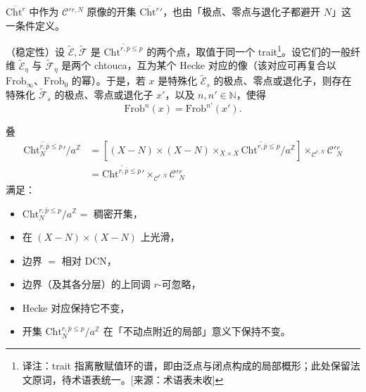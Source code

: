 \begin{lemma*}
$\overline{\mathrm{Cht}^{r}}$ 中作为 $\mathcal{C}'{}^{r,N}$ 原像的开集 $\overline{\mathrm{Cht}^{r}}{}'$，也由「极点、零点与退化子都避开 $N$」这一条件定义。
\end{lemma*}

\begin{theorem*}
（稳定性）设 $\tilde{\mathcal{E}},\tilde{\mathcal{F}}$ 是 $\overline{\mathrm{Cht}^{r,\bar{p}\le p}}$ 的两个点，取值于同一个 trait\footnote{译注：trait 指离散赋值环的谱，即由泛点与闭点构成的局部概形；此处保留法文原词，待术语表统一。[来源：术语表未收]}。设它们的一般纤维 $\tilde{\mathcal{E}}_{\eta}$ 与 $\tilde{\mathcal{F}}_{\eta}$ 是两个 chtouca，互为某个 Hecke 对应的像（该对应可再复合以 $\mathrm{Frob}_{\infty}$、$\mathrm{Frob}_{0}$ 的幂）。于是，若 $x$ 是特殊化 $\tilde{\mathcal{E}}_{s}$ 的极点、零点或退化子，则存在特殊化 $\tilde{\mathcal{F}}_{s}$ 的极点、零点或退化子 $x'$，以及 $n,n'\in\mathbb{N}$，使得
\[
\mathrm{Frob}^{n}(x)=\mathrm{Frob}^{n'}(x').
\]
\end{theorem*}

\begin{corollary*}
叠
\[
\begin{aligned}
\overline{\mathrm{Cht}^{r,\bar{p}\le p}_{N}}{}'/a^{\mathbb{Z}}&=[(X-N)\times(X-N)\times_{X\times X}\overline{\mathrm{Cht}^{r,\bar{p}\le p}}/a^{\mathbb{Z}}]\times_{\mathcal{C}^{r,N}}\mathcal{C}'{}^{r}_{N}\\
&=\overline{\mathrm{Cht}^{r,\bar{p}\le p}}{}'\times_{\mathcal{C}^{r,N}}\mathcal{C}'{}^{r}_{N}
\end{aligned}
\]
满足：

\begin{itemize}
\item {}$\mathrm{Cht}^{r,\bar{p}\le p}_{N}/a^{\mathbb{Z}}=$ 稠密开集，
\item 在 $(X-N)\times(X-N)$ 上光滑，
\item 边界 $=$ 相对 $\mathrm{DCN}$，
\item 边界（及其各分层）的上同调 $r$-可忽略，
\item Hecke 对应保持它不变，
\item 开集 $\mathrm{Cht}^{r,\bar{p}\le p}_{N}/a^{\mathbb{Z}}$ 在「不动点附近的局部」意义下保持不变。
\end{itemize}
\end{corollary*}
